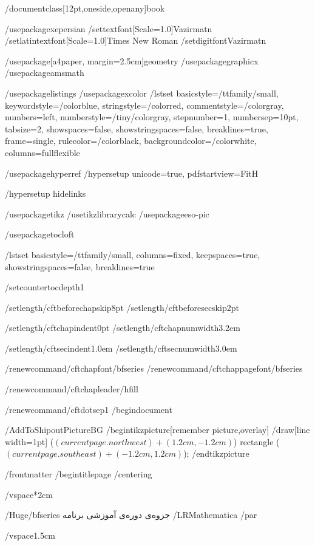 /documentclass[12pt,oneside,openany]{book}

/usepackage{xepersian}
/settextfont[Scale=1.0]{Vazirmatn}
/setlatintextfont[Scale=1.0]{Times New Roman}
/setdigitfont{Vazirmatn}

/usepackage[a4paper, margin=2.5cm]{geometry}
/usepackage{graphicx}
/usepackage{amsmath}

/usepackage{listings}
/usepackage{xcolor}
/lstset{
  basicstyle=/ttfamily/small,
  keywordstyle=/color{blue},
  stringstyle=/color{red},
  commentstyle=/color{gray},
  numbers=left,
  numberstyle=/tiny/color{gray},
  stepnumber=1,
  numbersep=10pt,
  tabsize=2,
  showspaces=false,
  showstringspaces=false,
  breaklines=true,
  frame=single,
  rulecolor=/color{black},
  backgroundcolor=/color{white},
  columns=fullflexible
}

/usepackage{hyperref}
/hypersetup{
  unicode=true,
  pdfstartview=FitH
}

/hypersetup{
	hidelinks
}

/usepackage{tikz}
/usetikzlibrary{calc}
/usepackage{eso-pic}

/usepackage{tocloft}

/lstset{
  basicstyle=/ttfamily/small,
  columns=fixed,
  keepspaces=true,
  showstringspaces=false,
  breaklines=true
}


/setcounter{tocdepth}{1}

/setlength{/cftbeforechapskip}{8pt}
/setlength{/cftbeforesecskip}{2pt}

/setlength{/cftchapindent}{0pt}
/setlength{/cftchapnumwidth}{3.2em}

/setlength{/cftsecindent}{1.0em}
/setlength{/cftsecnumwidth}{3.0em}

/renewcommand{/cftchapfont}{/bfseries}
/renewcommand{/cftchappagefont}{/bfseries}

/renewcommand{/cftchapleader}{/hfill}

/renewcommand{/cftdotsep}{1}
/begin{document}

/AddToShipoutPictureBG{%
  /begin{tikzpicture}[remember picture,overlay]
    /draw[line width=1pt]
      ($(current page.north west) + (1.2cm,-1.2cm)$)
        rectangle
      ($(current page.south east) + (-1.2cm,1.2cm)$);
  /end{tikzpicture}
}

/frontmatter
/begin{titlepage}
/centering

/vspace*{2cm}

{/Huge/bfseries
جزوه‌ی دوره‌ی آموزشی برنامه /LR{Mathematica}
/par}

/vspace{1.5cm}

